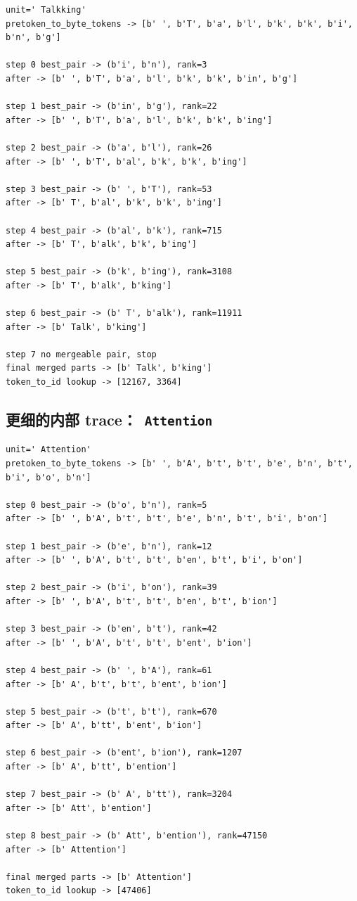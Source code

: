 \documentclass[11pt,a4paper]{ctexart}
\begin{document}
\begin{lstlisting}
unit=' Talkking'
pretoken_to_byte_tokens -> [b' ', b'T', b'a', b'l', b'k', b'k', b'i', b'n', b'g']

step 0 best_pair -> (b'i', b'n'), rank=3
after -> [b' ', b'T', b'a', b'l', b'k', b'k', b'in', b'g']

step 1 best_pair -> (b'in', b'g'), rank=22
after -> [b' ', b'T', b'a', b'l', b'k', b'k', b'ing']

step 2 best_pair -> (b'a', b'l'), rank=26
after -> [b' ', b'T', b'al', b'k', b'k', b'ing']

step 3 best_pair -> (b' ', b'T'), rank=53
after -> [b' T', b'al', b'k', b'k', b'ing']

step 4 best_pair -> (b'al', b'k'), rank=715
after -> [b' T', b'alk', b'k', b'ing']

step 5 best_pair -> (b'k', b'ing'), rank=3108
after -> [b' T', b'alk', b'king']

step 6 best_pair -> (b' T', b'alk'), rank=11911
after -> [b' Talk', b'king']

step 7 no mergeable pair, stop
final merged parts -> [b' Talk', b'king']
token_to_id lookup -> [12167, 3364]
\end{lstlisting}

\subsection{更细的内部 trace：\texttt{ Attention}}
\begin{lstlisting}
unit=' Attention'
pretoken_to_byte_tokens -> [b' ', b'A', b't', b't', b'e', b'n', b't', b'i', b'o', b'n']

step 0 best_pair -> (b'o', b'n'), rank=5
after -> [b' ', b'A', b't', b't', b'e', b'n', b't', b'i', b'on']

step 1 best_pair -> (b'e', b'n'), rank=12
after -> [b' ', b'A', b't', b't', b'en', b't', b'i', b'on']

step 2 best_pair -> (b'i', b'on'), rank=39
after -> [b' ', b'A', b't', b't', b'en', b't', b'ion']

step 3 best_pair -> (b'en', b't'), rank=42
after -> [b' ', b'A', b't', b't', b'ent', b'ion']

step 4 best_pair -> (b' ', b'A'), rank=61
after -> [b' A', b't', b't', b'ent', b'ion']

step 5 best_pair -> (b't', b't'), rank=670
after -> [b' A', b'tt', b'ent', b'ion']

step 6 best_pair -> (b'ent', b'ion'), rank=1207
after -> [b' A', b'tt', b'ention']

step 7 best_pair -> (b' A', b'tt'), rank=3204
after -> [b' Att', b'ention']

step 8 best_pair -> (b' Att', b'ention'), rank=47150
after -> [b' Attention']

final merged parts -> [b' Attention']
token_to_id lookup -> [47406]
\end{lstlisting}
\end{document}
